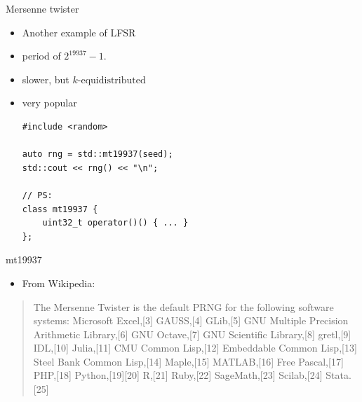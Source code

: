 \documentclass[10pt]{beamer}
\begin{document}
\begin{frame}[fragile,label={sec:org559f6f9}]{Mersenne twister}
 \begin{itemize}
\item Another example of LFSR
\item period of \(2^{19937} - 1\).
\item slower, but \(k\text{-equidistributed}\)
\item very popular
\begin{verbatim}
#include <random>

auto rng = std::mt19937(seed);
std::cout << rng() << "\n";

// PS:
class mt19937 { 
    uint32_t operator()() { ... }
};
\end{verbatim}
\end{itemize}
\end{frame}
\begin{frame}[label={sec:org15201d8}]{mt19937}
\begin{itemize}
\item From Wikipedia:
\end{itemize}
\begin{quote}
The Mersenne Twister is the default PRNG for the following software systems:
Microsoft Excel,[3] GAUSS,[4] GLib,[5] GNU Multiple Precision Arithmetic
Library,[6] GNU Octave,[7] GNU Scientific Library,[8] gretl,[9] IDL,[10]
Julia,[11] CMU Common Lisp,[12] Embeddable Common Lisp,[13] Steel Bank Common
Lisp,[14] Maple,[15] MATLAB,[16] Free Pascal,[17] PHP,[18] Python,[19][20]
R,[21] Ruby,[22] SageMath,[23] Scilab,[24] Stata.[25]
\end{quote}
\end{frame}
\end{document}
